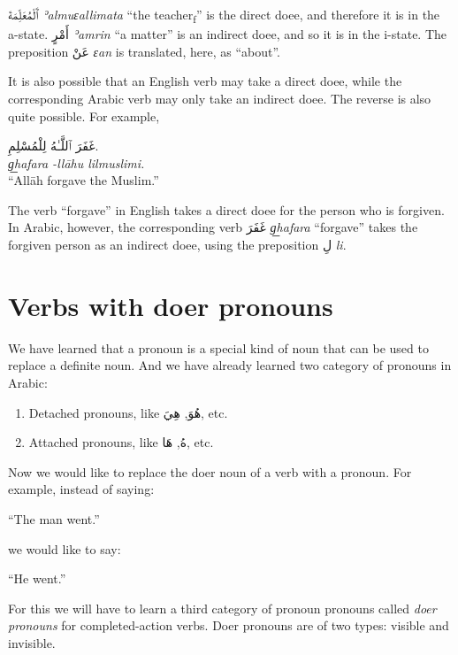 \documentclass[
  10pt,
]{book}
\providecommand{\tightlist}{%
  \setlength{\itemsep}{0pt}\setlength{\parskip}{0pt}}
\begin{document}
\foreignlanguage{arabic}{ٱَلْمُعَلِّمَةَ} \emph{ʾalmuɛallimata} \enquote{the teacher\textsubscript{f}} is the direct doee, and therefore it is in the a-state.
\foreignlanguage{arabic}{أَمْرٍ} \emph{ʾamrin} \enquote{a matter} is an indirect doee, and so it is in the i-state.
The preposition \foreignlanguage{arabic}{عَنْ} \emph{ɛan} is translated, here, as \enquote{about}.

It is also possible that an English verb may take a direct doee, while the corresponding Arabic verb may only take an indirect doee. The reverse is also quite possible. For example,

\foreignlanguage{arabic}{غَفَرَ ٱللَّـٰهُ لِلْمُسْلِمِ.}\\
\emph{g͟hafara -llāhu lilmuslimi.}\\
\enquote{Allāh forgave the Muslim.}

The verb \enquote{forgave} in English takes a direct doee for the person who is forgiven. In Arabic, however, the corresponding verb \foreignlanguage{arabic}{غَفَرَ} \emph{g͟hafara} \enquote{forgave} takes the forgiven person as an indirect doee, using the preposition \foreignlanguage{arabic}{لِ} \emph{li}.

\section{Verbs with doer pronouns}\label{verbs-with-doer-pronouns}

We have learned that a pronoun is a special kind of noun that can be used to replace a definite noun. And we have already learned two category of pronouns in Arabic:

\begin{enumerate}
\def\labelenumi{\roman{enumi}.}
\tightlist
\item
  Detached pronouns, like \foreignlanguage{arabic}{هُوَ}, \foreignlanguage{arabic}{هِيَ}, etc.
\item
  Attached pronouns, like \foreignlanguage{arabic}{هُ}, \foreignlanguage{arabic}{هَا}, etc.
\end{enumerate}

Now we would like to replace the doer noun of a verb with a pronoun. For example, instead of saying:

\enquote{The man went.}

we would like to say:

\enquote{He went.}

For this we will have to learn a third category of pronoun pronouns called \emph{doer pronouns} for completed-action verbs.
Doer pronouns are of two types: visible and invisible.
\end{document}
